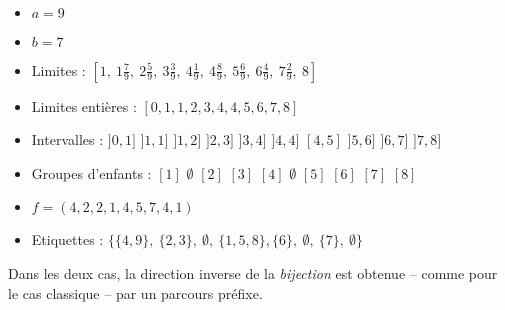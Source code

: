 \begin{expl}[$a > b$]
    ~
    \begin{itemize}
        \item $a = 9$
        \item $b = 7$
        \item Limites : $[1,\ 1 \frac{7}{9},\ 
            2 \frac{5}{9},\ 3 \frac{3}{9},\  
            4 \frac{1}{9},\ 4 \frac{8}{9},\ 
            5 \frac{6}{9},\ 6 \frac{4}{9},\ 
            7 \frac{2}{9},\ 8]$
        \item Limites entières : $[0,1,1,2,3,4,4,5,6,7,8]$
        \item Intervalles :
            \subitem $]0, 1]$ \hspace{5mm} $]1, 1]$
            \hspace{5mm} $]1, 2]$ \hspace{5mm} $]2, 3]$
            \hspace{5mm} $]3, 4]$ 
            \subitem $]4, 4]$ \hspace{5mm} $[4, 5]$
            \hspace{5mm} $]5, 6]$ \hspace{5mm} $]6, 7]$
            \hspace{5mm} $]7, 8]$
        \item Groupes d'enfants :
            \subitem $[1]$ \hspace{5mm} $\emptyset$ 
            \hspace{5mm} $[2]$ \hspace{5mm} $[3]$
            \hspace{5mm} $[4]$ \hspace{5mm} $\emptyset$
            \hspace{5mm} $[5]$ \hspace{5mm} $[6]$
            \hspace{5mm} $[7]$ \hspace{5mm} $[8]$
        \item $f = (4,2,2,1,4,5,7,4,1)$
        \item Etiquettes : $\{\{4,9\},\ \{2,3\},\ \emptyset,\ 
            \{1,5,8\}, \{6\},\ \emptyset,\ \{7\},\ 
            \emptyset\}$\\
    \end{itemize}
    
\end{expl}

Dans les deux cas, la direction inverse de la \emph{bijection} est obtenue
-- comme pour le cas classique -- par un parcours préfixe.